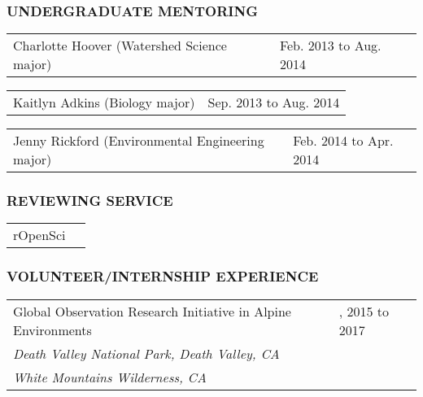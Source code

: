 \documentclass[11pt,english]{article}
\providecommand{\tabularnewline}{\\}
\begin{document}
\subsubsection*{UNDERGRADUATE MENTORING}
\vspace{-0.5ex}

\begin{tabular}{>{\raggedright}p{4in}>{\raggedleft}p{2in}}
Charlotte Hoover (Watershed Science major) & Feb. 2013 to Aug. 2014 \tabularnewline
\end{tabular}

\begin{tabular}{>{\raggedright}p{4in}>{\raggedleft}p{2in}}
Kaitlyn Adkins (Biology major) & Sep. 2013 to Aug. 2014\tabularnewline
\end{tabular}

\begin{tabular}{>{\raggedright}p{4in}>{\raggedleft}p{2in}}
Jenny Rickford (Environmental Engineering major) & Feb. 2014 to Apr. 2014
\end{tabular}


\vspace{1.5ex}
\subsubsection*{REVIEWING SERVICE}
\vspace{-0.5ex}

\begin{tabular}{>{\raggedright}p{4in}>{\raggedleft}p{2in}}
rOpenSci \tabularnewline
\end{tabular}


\vspace{1.5ex}
\subsubsection*{VOLUNTEER/INTERNSHIP EXPERIENCE}
\vspace{-0.5ex}

\begin{tabular}{>{\raggedright}p{4.5in}>{\raggedleft}p{1.5in}}
Global Observation Research Initiative in Alpine Environments & 2013, 2015 to 2017\tabularnewline
\hspace{1.5em}\emph{Death Valley National Park, Death Valley, CA}\\
\hspace{1.5em}\emph{White Mountains Wilderness, CA}
\end{tabular}
\end{document}
